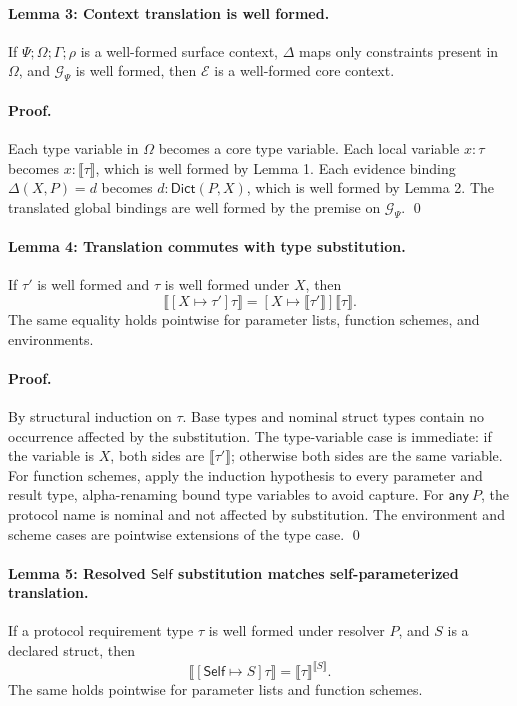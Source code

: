 \documentclass[manuscript,nonacm]{acmart}
\newcommand{\kw}[1]{\ensuremath{\mathsf{#1}}}
\newcommand{\Self}{\kw{Self}\xspace}
\newcommand{\Any}[1]{\kw{any}\ #1}
\newcommand{\subst}[3]{[#2\mapsto #1]#3}
\newcommand{\trans}[1]{\llbracket #1 \rrbracket}
\newcommand{\transSelf}[2]{\llbracket #2 \rrbracket^{#1}}
\newcommand{\Dict}{\mathsf{Dict}}
\begin{document}
\paragraph{Lemma 3: Context translation is well formed.}
If $\Psi;\Omega;\Gamma;\rho$ is a well-formed surface context, $\Delta$ maps only constraints present in $\Omega$, and $\mathcal{G}_\Psi$ is well formed, then $\mathcal{E}$ is a well-formed core context.

\paragraph{Proof.}
Each type variable in $\Omega$ becomes a core type variable.
Each local variable $x:\tau$ becomes $x:\trans{\tau}$, which is well formed by Lemma 1.
Each evidence binding $\Delta(X,P)=d$ becomes $d:\Dict(P,X)$, which is well formed by Lemma 2.
The translated global bindings are well formed by the premise on $\mathcal{G}_\Psi$.
\qed

\paragraph{Lemma 4: Translation commutes with type substitution.}
If $\tau'$ is well formed and $\tau$ is well formed under $X$, then
\[
  \trans{\subst{\tau'}{X}\tau}
  =
  \subst{\trans{\tau'}}{X}\trans{\tau}.
\]
The same equality holds pointwise for parameter lists, function schemes, and environments.

\paragraph{Proof.}
By structural induction on $\tau$.
Base types and nominal struct types contain no occurrence affected by the substitution.
The type-variable case is immediate: if the variable is $X$, both sides are $\trans{\tau'}$; otherwise both sides are the same variable.
For function schemes, apply the induction hypothesis to every parameter and result type, alpha-renaming bound type variables to avoid capture.
For $\Any{P}$, the protocol name is nominal and not affected by substitution.
The environment and scheme cases are pointwise extensions of the type case.
\qed

\paragraph{Lemma 5: Resolved \Self substitution matches self-parameterized translation.}
If a protocol requirement type $\tau$ is well formed under resolver $P$, and $S$ is a declared struct, then
\[
  \trans{[\Self\mapsto S]\tau}=\transSelf{\trans{S}}{\tau}.
\]
The same holds pointwise for parameter lists and function schemes.
\end{document}
